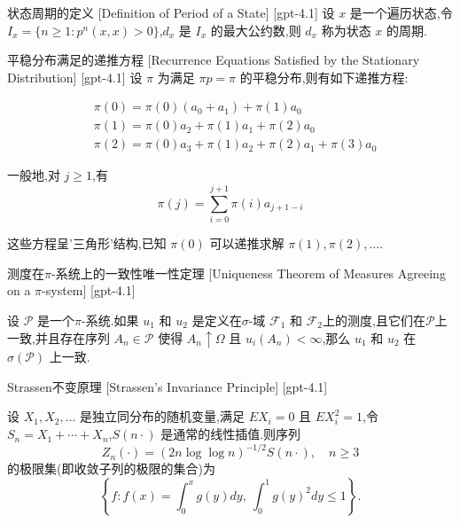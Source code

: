 \documentclass[UTF8]{ctexart}
\begin{document}
    
    
    \begin{dfn}
        {状态周期的定义}
        [Definition of Period of a State]
        [gpt-4.1]
        设 $x$ 是一个遍历状态,令 $I_x = \{ n \geq 1 : p^n(x, x) > 0 \}$,$d_x$ 是 $I_x$ 的最大公约数,则 $d_x$ 称为状态 $x$ 的周期.
    \end{dfn}
    
    
    
    \begin{ppt}
        {平稳分布满足的递推方程}
        [Recurrence Equations Satisfied by the Stationary Distribution]
        [gpt-4.1]
        设 $\pi$ 为满足 $\pi p = \pi$ 的平稳分布,则有如下递推方程:

\[
\begin{array}{rl}
  & \pi(0) = \pi(0) (a_{0} + a_{1}) + \pi(1) a_{0} \\
  & \pi(1) = \pi(0) a_{2} + \pi(1) a_{1} + \pi(2) a_{0} \\
  & \pi(2) = \pi(0) a_{3} + \pi(1) a_{2} + \pi(2) a_{1} + \pi(3) a_{0}
\end{array}
\]

一般地,对 $j \geq 1$,有
\[
\pi(j) = \sum_{i = 0}^{j + 1} \pi(i) a_{j + 1 - i}
\]

这些方程呈'三角形'结构,已知 $\pi(0)$ 可以递推求解 $\pi(1), \pi(2), \ldots$.

    \end{ppt}
    
    
    
    \begin{thm}
        {测度在$\pi$-系统上的一致性唯一性定理}
        [Uniqueness Theorem of Measures Agreeing on a $\pi$-system]
        [gpt-4.1]
        
设 $\mathcal{P}$ 是一个$\pi$-系统.如果 $
u_1$ 和 $
u_2$ 是定义在$\sigma$-域 $\mathcal{F}_1$ 和 $\mathcal{F}_2$上的测度,且它们在$\mathcal{P}$上一致,并且存在序列 $A_n \in \mathcal{P}$ 使得 $A_n \uparrow \Omega$ 且 $
u_i(A_n) < \infty$,那么 $
u_1$ 和 $
u_2$ 在 $\sigma(\mathcal{P})$ 上一致.

    \end{thm}
    
    
    
    \begin{thm}
        {Strassen不变原理}
        [Strassen's Invariance Principle]
        [gpt-4.1]
        
设 $X_{1}, X_{2}, \ldots$ 是独立同分布的随机变量,满足 $E X_{i} = 0$ 且 $E X_{i}^{2} = 1$,令 $S_{n} = X_{1} + \cdots + X_{n}$,$S(n\cdot)$ 是通常的线性插值.则序列
\[
Z_{n}(\cdot) = (2n \log \log n)^{-1/2} S(n\cdot), \quad n \geq 3
\]
的极限集(即收敛子列的极限的集合)为
\[
\left\{ f : f(x) = \int_{0}^{x} g(y) dy,\ \int_{0}^{1} g(y)^{2} dy \leq 1 \right\}.
\]

    \end{thm}
    
\end{document}
